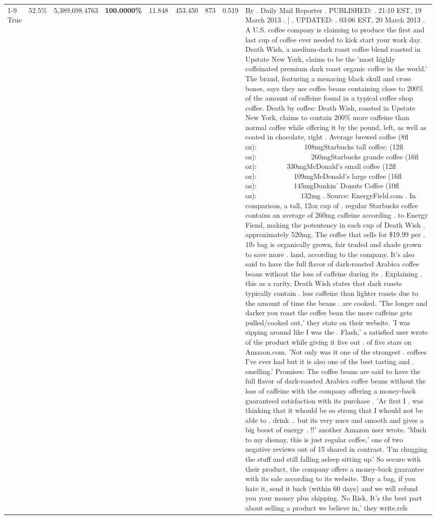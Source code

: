 \begin{table}[H]
{\begin{tabular}{lllrlllll}
\cline{1-9}
True & 52.5\% & 5,389,698.4763 & \bfseries \color{red} 100.0000\% & 11.848 & 453.450 & 873 & 0.519 & By . Daily Mail Reporter . PUBLISHED: . 21:10 EST, 19 March 2013 . | . UPDATED: . 03:06 EST, 20 March 2013 . A U.S. coffee company is claiming to produce the first and last cup of coffee ever needed to kick start your work day. Death Wish, a medium-dark roast coffee blend roasted in Upstate New York, claims to be the 'most highly caffeinated premium dark roast organic coffee in the world.' The brand, featuring a menacing black skull and cross bones, says they use coffee beans containing close to 200\% of the amount of caffeine found in a typical coffee shop coffee. Death by coffee: Death Wish, roasted in Upstate New York, claims to contain 200\% more caffeine than normal coffee while offering it by the pound, left, as well as coated in chocolate, right . Average brewed coffee (8fl oz):              108mgStarbucks tall coffee: (12fl oz):                260mgStarbucks grande coffee (16fl oz):         330mgMcDonald's small coffee (12fl oz):           109mgMcDonald's large coffee (16fl oz):           145mgDunkin' Donuts Coffee (10fl oz):             132mg . Source: EnergyField.com . In comparison, a tall, 12oz cup of . regular Starbucks coffee contains an average of 260mg caffeine according . to Energy Fiend, making the potentency in each cup of Death Wish . approximately 520mg. The coffee that sells for \$19.99 per . 1lb bag is organically grown, fair traded and shade grown to save more . land, according to the company. It's also said to have the full flavor of dark-roasted Arabica coffee beans without the loss of caffeine during its . Explaining . this as a rarity, Death Wish states that dark roasts typically contain . less caffeine than lighter roasts due to the amount of time the beans . are cooked. 'The longer and darker you roast the coffee bean the more caffeine gets pulled/cooked out,' they state on their website. 'I was zipping around like I was the . Flash,' a satisfied user wrote of the product while giving it five out . of five stars on Amazon.com. 'Not only was it one of the strongest . coffees I've ever had but it is also one of the best tasting and . smelling.’ Promises: The coffee beans are said to have the full flavor of dark-roasted Arabica coffee beans without the loss of caffeine with the company offering a money-back guaranteed satisfaction with its purchase . 'Ar first I . was thinking that it whould be so strong that I whould not be able to . drink .. but its very nuce and smooth and gives a big boost of energy . !!' another Amazon user wrote. 'Much to my dismay, this is just regular coffee,' one of two negative reviews out of 15 shared in contrast. 'I'm chugging the stuff and still falling asleep sitting up.' So secure with their product, the company offers a money-back guarantee with its sale according to its website. 'Buy a bag, if you hate it, send it back (within 60 days) and we will refund you your money plus shipping. No Risk. It’s the best part about selling a product we believe in,' they write.refs \\

\end{tabular}}
\end{table}

